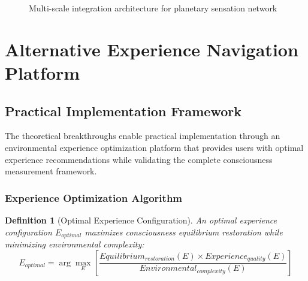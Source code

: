 \documentclass[12pt,a4paper]{article}
\newtheorem{definition}{Definition}
\begin{document}
\begin{figure}[H]
\centering
{}
\caption{Multi-scale integration architecture for planetary sensation network}
\label{fig:architecture}
\end{figure}

\section{Alternative Experience Navigation Platform}

\subsection{Practical Implementation Framework}

The theoretical breakthroughs enable practical implementation through an environmental experience optimization platform that provides users with optimal experience recommendations while validating the complete consciousness measurement framework.

\subsubsection{Experience Optimization Algorithm}

\begin{definition}[Optimal Experience Configuration]
An optimal experience configuration $E_{optimal}$ maximizes consciousness equilibrium restoration while minimizing environmental complexity:
\begin{equation}
E_{optimal} = \arg\max_E \left[\frac{Equilibrium_{restoration}(E) \times Experience_{quality}(E)}{Environmental_{complexity}(E)}\right]
\end{equation}
\end{definition}
\end{document}
